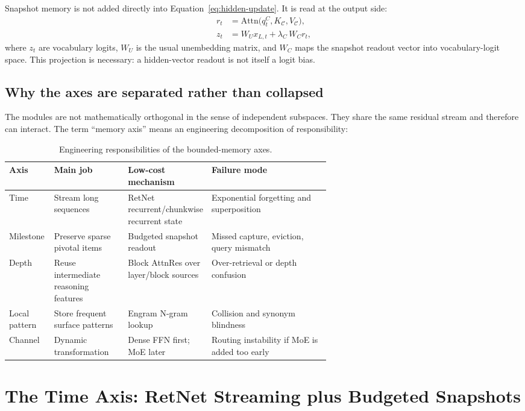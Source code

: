 \documentclass[preprint,12pt]{elsarticle}
\newcommand{\Cache}{\mathcal{C}}
\begin{document}
Snapshot memory is not added directly into Equation~\eqref{eq:hidden-update}. It is read at the output side:
\begin{align}
\label{eq:snapshot-read}
r_t &= \mathrm{Attn}\big(q_t^C, K_{\Cache}, V_{\Cache}\big),\\
z_t &= W_U x_{L,t} + \lambda_{C}\, W_C r_t,
\label{eq:logit-read}
\end{align}
where $z_t$ are vocabulary logits, $W_U$ is the usual unembedding matrix, and $W_C$ maps the snapshot readout vector into vocabulary-logit space. This projection is necessary: a hidden-vector readout is not itself a logit bias.

\subsection{Why the axes are separated rather than collapsed}

The modules are not mathematically orthogonal in the sense of independent subspaces. They share the same residual stream and therefore can interact. The term ``memory axis'' means an engineering decomposition of responsibility:
\begin{table}[htbp]
\centering
\caption{Engineering responsibilities of the bounded-memory axes.}
\label{tab:memory-axes}
\small
\begin{tabularx}{\linewidth}{p{0.14\linewidth}p{0.23\linewidth}p{0.25\linewidth}X}
\toprule
Axis & Main job & Low-cost mechanism & Failure mode \\
\midrule
Time & Stream long sequences & RetNet recurrent/chunkwise recurrent state & Exponential forgetting and superposition \\
Milestone & Preserve sparse pivotal items & Budgeted snapshot readout & Missed capture, eviction, query mismatch \\
Depth & Reuse intermediate reasoning features & Block AttnRes over layer/block sources & Over-retrieval or depth confusion \\
Local pattern & Store frequent surface patterns & Engram N-gram lookup & Collision and synonym blindness \\
Channel & Dynamic transformation & Dense FFN first; MoE later & Routing instability if MoE is added too early \\
\bottomrule
\end{tabularx}
\end{table}

\section{The Time Axis: RetNet Streaming plus Budgeted Snapshots}
\label{sec:snapshots}
\end{document}
